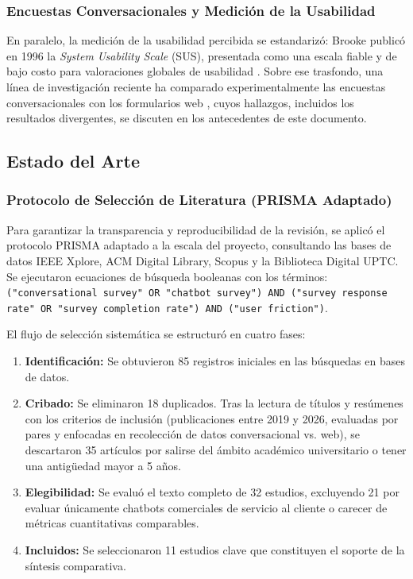 \documentclass[12pt,letterpaper]{article}
\begin{document}
\subsubsection{Encuestas Conversacionales y Medición de la Usabilidad}
 
En paralelo, la medición de la usabilidad percibida se estandarizó: Brooke publicó en 1996 la \textit{System Usability Scale} (SUS), presentada como una escala fiable y de bajo costo para valoraciones globales de usabilidad \cite{brooke1996}. Sobre ese trasfondo, una línea de investigación reciente ha comparado experimentalmente las encuestas conversacionales con los formularios web \cite{kim2019, xiao2020, beam2023, zarouali2023, devecifuchs2026}, cuyos hallazgos, incluidos los resultados divergentes, se discuten en los antecedentes de este documento.

\subsection{Estado del Arte}
 
\subsubsection{Protocolo de Selección de Literatura (PRISMA Adaptado)}
Para garantizar la transparencia y reproducibilidad de la revisión, se aplicó el protocolo PRISMA adaptado a la escala del proyecto, consultando las bases de datos IEEE Xplore, ACM Digital Library, Scopus y la Biblioteca Digital UPTC. Se ejecutaron ecuaciones de búsqueda booleanas con los términos: \texttt{("conversational survey" OR "chatbot survey") AND ("survey response rate" OR "survey completion rate") AND ("user friction")}.
 
El flujo de selección sistemática se estructuró en cuatro fases:
\begin{enumerate}
    \item \textbf{Identificación:} Se obtuvieron 85 registros iniciales en las búsquedas en bases de datos.
    \item \textbf{Cribado:} Se eliminaron 18 duplicados. Tras la lectura de títulos y resúmenes con los criterios de inclusión (publicaciones entre 2019 y 2026, evaluadas por pares y enfocadas en recolección de datos conversacional vs. web), se descartaron 35 artículos por salirse del ámbito académico universitario o tener una antigüedad mayor a 5 años.
    \item \textbf{Elegibilidad:} Se evaluó el texto completo de 32 estudios, excluyendo 21 por evaluar únicamente chatbots comerciales de servicio al cliente o carecer de métricas cuantitativas comparables.
    \item \textbf{Incluidos:} Se seleccionaron 11 estudios clave que constituyen el soporte de la síntesis comparativa.
\end{enumerate}
 
\end{document}
